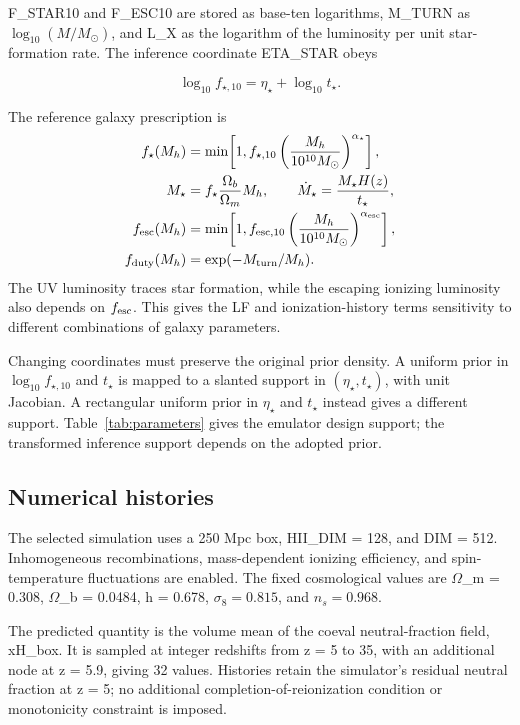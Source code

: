 F\_STAR10 and F\_ESC10 are stored as base-ten logarithms, M\_TURN as $\log_{10}(M/M_\odot)$, and L\_X as the logarithm of the luminosity per unit star-formation rate. The inference coordinate ETA\_STAR obeys

\begin{equation}\log_{10}f_{\star,10}=\eta_\star+\log_{10}t_\star.\end{equation}

The reference galaxy prescription \cite{Park2019} is
\begin{align}
f_\star(M_h)&=\min\!\left[1,f_{\star,10}\left(\frac{M_h}{10^{10}M_\odot}\right)^{\alpha_\star}\right],\\
M_\star&=f_\star\frac{\Omega_b}{\Omega_m}M_h,\qquad
\dot M_\star=\frac{M_\star H(z)}{t_\star},\\
f_{\rm esc}(M_h)&=\min\!\left[1,f_{{\rm esc},10}\left(\frac{M_h}{10^{10}M_\odot}\right)^{\alpha_{\rm esc}}\right],\\
f_{\rm duty}(M_h)&=\exp(-M_{\rm turn}/M_h).
\end{align}
The UV luminosity traces star formation, while the escaping ionizing luminosity also depends on $f_{\rm esc}$. This gives the LF and ionization-history terms sensitivity to different combinations of galaxy parameters.

Changing coordinates must preserve the original prior density. A uniform prior in $\log_{10} f_{\star,10}$ and $t_\star$ is mapped to a slanted support in $(\eta_\star,t_\star)$, with unit Jacobian. A rectangular uniform prior in $\eta_\star$ and $t_\star$ instead gives a different support. Table~\ref{tab:parameters} gives the emulator design support; the transformed inference support depends on the adopted prior.

\subsection{Numerical histories}\label{numerical-histories}

The selected simulation uses a 250 Mpc box, HII\_DIM = 128, and DIM = 512. Inhomogeneous recombinations, mass-dependent ionizing efficiency, and spin-temperature fluctuations are enabled. The fixed cosmological values are \(\Omega\)\_m = 0.308, \(\Omega\)\_b = 0.0484, h = 0.678, $\sigma_8=0.815$, and $n_s=0.968$.

The predicted quantity is the volume mean of the coeval neutral-fraction field, xH\_box. It is sampled at integer redshifts from z = 5 to 35, with an additional node at z = 5.9, giving 32 values. Histories retain the simulator's residual neutral fraction at z = 5; no additional completion-of-reionization condition or monotonicity constraint is imposed.

